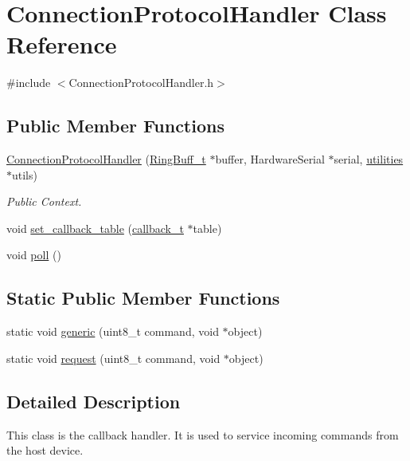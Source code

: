 \hypertarget{class_connection_protocol_handler}{\section{\-Connection\-Protocol\-Handler \-Class \-Reference}
\label{class_connection_protocol_handler}
}


{\ttfamily \#include $<$\-Connection\-Protocol\-Handler.\-h$>$}

\subsection*{\-Public \-Member \-Functions}
\begin{DoxyCompactItemize}
\item 
\hyperlink{class_connection_protocol_handler_aba243f08aafb26db4c9e5e71732ea293}{\-Connection\-Protocol\-Handler} (\hyperlink{struct_ring_buff__t}{\-Ring\-Buff\-\_\-t} $\ast$buffer, \-Hardware\-Serial $\ast$serial, \hyperlink{classutilities}{utilities} $\ast$utils)
\begin{DoxyCompactList}\small\item\em \-Public \-Context. \end{DoxyCompactList}\item 
void \hyperlink{class_connection_protocol_handler_af8b3a3a0e921bf3d45eaca8301e25fe5}{set\-\_\-callback\-\_\-table} (\hyperlink{structcallback__t}{callback\-\_\-t} $\ast$table)
\item 
void \hyperlink{class_connection_protocol_handler_a7ff2a420924a2bc81152f22972ec2822}{poll} ()
\end{DoxyCompactItemize}
\subsection*{\-Static \-Public \-Member \-Functions}
\begin{DoxyCompactItemize}
\item 
static void \hyperlink{class_connection_protocol_handler_a956d4439d9ebc3932949c6ff95f9b4d9}{generic} (uint8\-\_\-t command, void $\ast$object)
\item 
static void \hyperlink{class_connection_protocol_handler_a0caba597a54e32503cff6e45c1b26720}{request} (uint8\-\_\-t command, void $\ast$object)
\end{DoxyCompactItemize}


\subsection{\-Detailed \-Description}
\-This class is the callback handler. \-It is used to service incoming commands from the host device.

